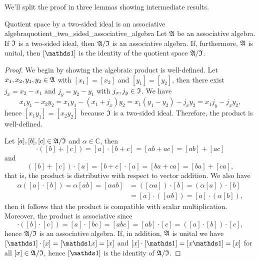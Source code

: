 We'll split the proof in three lemmas showing intermediate results.
\begin{lemma}{Quotient space by a two-sided ideal is an associative algebra}{quotient_two_sided_associative_algebra}
    Let \(\mathfrak{A}\) be an associative algebra. If \(\mathfrak{I}\) is a two-sided ideal, then \(\mathfrak{A}/\mathfrak{I}\) is an associative algebra. If, furthermore, \(\mathfrak{A}\) is unital, then \([\unity]\) is the identity of the quotient space \(\mathfrak{A}/\mathfrak{I}\).
\end{lemma}
\begin{proof}
    We begin by showing the algebraic product is well-defined. Let \(x_1, x_2, y_1, y_2 \in \mathfrak{A}\) with \([x_1] = [x_2]\) and \([y_1] = [y_2]\), then there exist \(j_x = x_2 - x_1\) and \(j_y = y_2 - y_1\) with \(j_x, j_y \in \mathfrak{I}\). We have
    \begin{equation*}
        x_1y_1 - x_2 y_2 = x_1 y_1 - (x_1 + j_x) y_2 = x_1 (y_1 - y_2) - j_x y_2 = x_1 j_y - j_x y_2,
    \end{equation*}
    hence \([x_1 y_1] = [x_2 y_2]\) because \(\mathfrak{I}\) is a two-sided ideal. Therefore, the product is well-defined.

    Let \([a], [b], [c] \in \mathfrak{A}/\mathfrak{I}\) and \(\alpha \in \mathbb{C}\), then
    \begin{equation*}
        [a] \cdot ([b]+[c]) = [a]\cdot[b+c] = [ab + ac] = [ab] + [ac]
    \end{equation*}
    and
    \begin{equation*}
        ([b]+[c])\cdot[a] = [b+c]\cdot[a] = [ba + ca] = [ba] + [ca],
    \end{equation*}
    that is, the product is distributive with respect to vector addition. We also have
    \begin{align*}
        \alpha([a]\cdot[b]) = \alpha[ab] = [\alpha ab] &= ([\alpha a])\cdot[b] = (\alpha[a])\cdot[b]\\
                                                       &= [a]\cdot([\alpha b]) = [a]\cdot (\alpha[b]),
    \end{align*}
    then it follows that the product is compatible with scalar multiplication. Moreover, the product is associative since
    \begin{equation*}
        [a]\cdot([b]\cdot[c]) = [a]\cdot[bc]=[abc] = [ab] \cdot [c] = ([a]\cdot[b])\cdot[c],
    \end{equation*}
    hence \(\mathfrak{A}/\mathfrak{I}\) is an associative algebra. If, in addition, \(\mathfrak{A}\) is unital we have \([\unity]\cdot[x] = [\unity x] = [x]\) and \([x]\cdot[\unity] = [x \unity] = [x]\) for all \([x] \in \mathfrak{A}/\mathfrak{I}\), hence \([\unity]\) is the identity of \(\mathfrak{A}/\mathfrak{I}\).
\end{proof}
